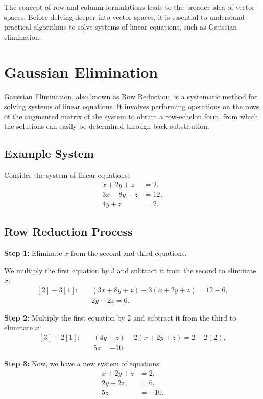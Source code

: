 The concept of row and column formulations leads to the broader idea of vector spaces. Before delving deeper into vector spaces, it is essential to understand practical algorithms to solve systems of linear equations, such as Gaussian elimination.


\section{Gaussian Elimination}

Gaussian Elimination, also known as Row Reduction, is a systematic method for solving systems of linear equations. It involves performing operations on the rows of the augmented matrix of the system to obtain a row-echelon form, from which the solutions can easily be determined through back-substitution.

\subsection*{Example System}

Consider the system of linear equations:
\begin{align}
    x + 2y + z &= 2, \\
    3x + 8y + z &= 12, \\
    4y + z &= 2.
\end{align}

\subsection*{Row Reduction Process}

\textbf{Step 1:} Eliminate \( x \) from the second and third equations.

We multiply the first equation by 3 and subtract it from the second to eliminate \( x \):
\[
\begin{aligned}
    [2] - 3[1]: & \quad (3x + 8y + z) - 3( x + 2y + z) = 12 - 6, \\
    & \quad 2y - 2z = 6.
\end{aligned}
\]

\textbf{Step 2:} Multiply the first equation by 2 and subtract it from the third to eliminate \( x \):
\[
\begin{aligned}
    [3] - 2[1]: & \quad (4y + z) - 2( x + 2y + z)  = 2-2(2) , \\
    & \quad 5z = -10.
\end{aligned}
\]

\textbf{Step 3:} Now, we have a new system of equations:
\begin{align}
    x + 2y + z &= 2, \\
     2y - 2z &= 6, \\
    5z &= -10.
\end{align}

